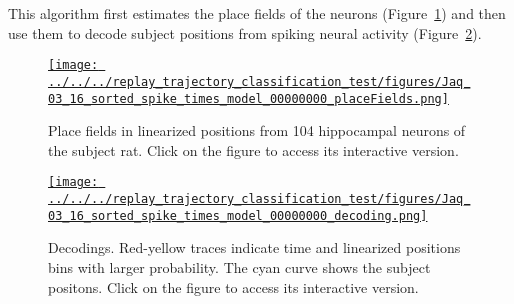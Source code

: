 \documentclass{article}
\begin{document}
This algorithm first estimates the place fields of the neurons
(Figure~\ref{fig:placeFields}) and then use them to decode subject positions
from spiking neural activity (Figure~\ref{fig:decodings}).

\begin{figure}
    \begin{center}
        \href{https://www.gatsby.ucl.ac.uk/~rapela/hippocampalDecoding/figures/Jaq_03_16_sorted_spike_times_model_00000000_placeFields.html}{\texttt{[image: ../../../replay\_trajectory\_classification\_test/figures/Jaq\_03\_16\_sorted\_spike\_times\_model\_00000000\_placeFields.png]}}
		\caption{Place fields in linearized positions from 104 hippocampal neurons of the subject rat. Click on the figure to access its interactive version.}
        \label{fig:placeFields}
    \end{center}
\end{figure}

\begin{figure}
    \begin{center}
        \href{https://www.gatsby.ucl.ac.uk/~rapela/hippocampalDecoding/figures/Jaq_03_16_sorted_spike_times_00000000_decoding.html}{\texttt{[image: ../../../replay\_trajectory\_classification\_test/figures/Jaq\_03\_16\_sorted\_spike\_times\_model\_00000000\_decoding.png]}}
		\caption{Decodings. Red-yellow traces indicate time and linearized positions bins with larger probability. The cyan curve shows the subject positons. Click on the figure to access its interactive version.}
        \label{fig:decodings}
    \end{center}
\end{figure}



\end{document}
